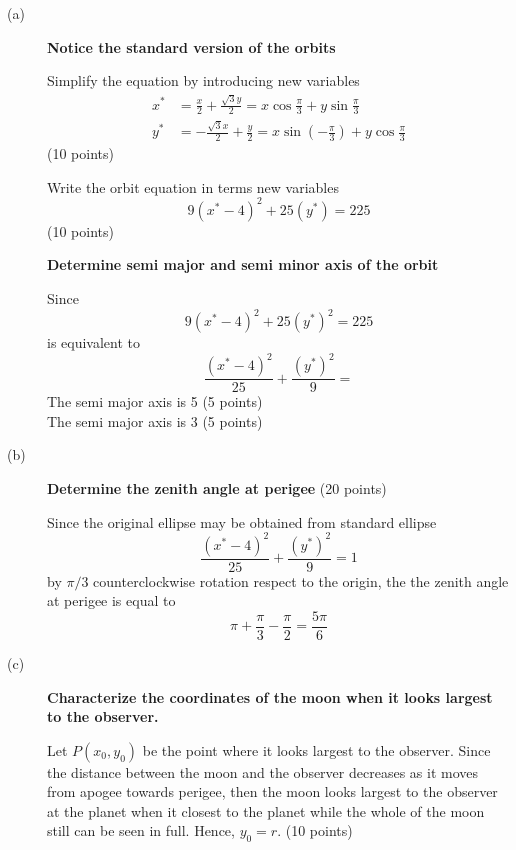 \begin{description}
\item[(a)] \textbf{Notice the standard version of the orbits}

  Simplify the equation by introducing new variables
  \begin{align*}
    x^* &= \frac{x}{2} + \frac{\sqrt{3}y}{2}
      = x\cos\frac{\pi}{3} + y\sin\frac{\pi}{3} \\
    y^* &= -\frac{\sqrt{3}x}{2} + \frac{y}{2}
      = x\sin\left(-\frac{\pi}{3}\right) + y\cos\frac{\pi}{3}
  \end{align*}
  \hfill(10 points)

  Write the orbit equation in terms new variables %
  \[
    9(x^* - 4)^2 + 25(y^*) = 225 %
  \]
  \hfill(10 points)


  \textbf{Determine semi major and semi minor axis of the orbit}

  Since
  \[
    9(x^* - 4)^2 + 25(y^*)^2 = 225
  \]
  is equivalent to
  \[
    \frac{(x^* - 4)^2}{25} + \frac{(y^*)^2}{9} = %
  \]
  The semi major axis is 5 \hfill(5 points) \\
  The semi major axis is 3 \hfill(5 points) %

\item[(b)] \textbf{Determine the zenith angle at perigee} \hfill(20 points)

  Since the original ellipse may be obtained from standard ellipse
  \[
    \frac{(x^* - 4)^2}{25} + \frac{(y^*)^2}{9} = 1
  \]
  by $\pi/3$ counterclockwise rotation respect to the origin, the the zenith %
  angle at perigee is equal to
  \[
    \pi + \frac{\pi}{3} - \frac{\pi}{2} = \frac{5\pi}{6}
  \]

\item[(c)] \textbf{Characterize the coordinates of the moon when it looks
  largest to the observer.}

  Let $P(x_0, y_0)$ be the point where it looks largest to the observer. Since
  the distance between the moon and the observer decreases as it moves from
  apogee towards perigee, then the moon looks largest to the observer at the
  planet when it closest to the planet while the whole of the moon still can
  be seen in full. Hence, $y_0 = r$. \hfill(10 points)


\end{description}
